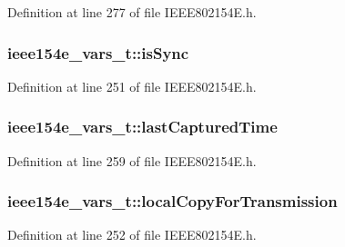 Definition at line 277 of file I\+E\+E\+E802154\+E.\+h.

\subsubsection[{\texorpdfstring{is\+Sync}{isSync}}]{ ieee154e\+\_\+vars\+\_\+t\+::is\+Sync}\hypertarget{structieee154e__vars__t_ae8f15b78d598718fce4c07fdd0c8025a}{}\label{structieee154e__vars__t_ae8f15b78d598718fce4c07fdd0c8025a}


Definition at line 251 of file I\+E\+E\+E802154\+E.\+h.

\subsubsection[{\texorpdfstring{last\+Captured\+Time}{lastCapturedTime}}]{ ieee154e\+\_\+vars\+\_\+t\+::last\+Captured\+Time}\hypertarget{structieee154e__vars__t_a51c3f927191002cab101439234cc8550}{}\label{structieee154e__vars__t_a51c3f927191002cab101439234cc8550}


Definition at line 259 of file I\+E\+E\+E802154\+E.\+h.

\subsubsection[{\texorpdfstring{local\+Copy\+For\+Transmission}{localCopyForTransmission}}]{ ieee154e\+\_\+vars\+\_\+t\+::local\+Copy\+For\+Transmission}\hypertarget{structieee154e__vars__t_a6c5570bab2d3a36f99c39617f5783334}{}\label{structieee154e__vars__t_a6c5570bab2d3a36f99c39617f5783334}


Definition at line 252 of file I\+E\+E\+E802154\+E.\+h.

